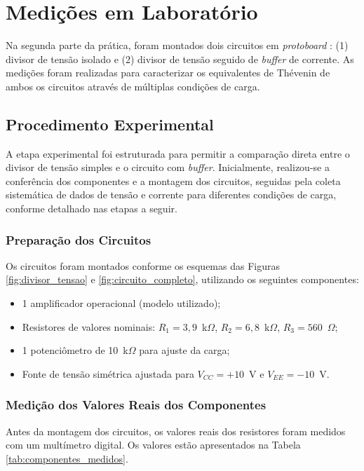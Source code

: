 \chapter{Medições em Laboratório}

Na segunda parte da prática, foram montados dois circuitos em \textit{protoboard} : (1) divisor de tensão isolado e (2) divisor de tensão seguido de \textit{buffer} de corrente. As medições foram realizadas para caracterizar os equivalentes de Thévenin de ambos os circuitos através de múltiplas condições de carga.

\section{Procedimento Experimental}
A etapa experimental foi estruturada para permitir a comparação direta entre o divisor de tensão simples e o circuito com \textit{buffer}. Inicialmente, realizou-se a conferência dos componentes e a montagem dos circuitos, seguidas pela coleta sistemática de dados de tensão e corrente para diferentes condições de carga, conforme detalhado nas etapas a seguir.
\subsection{Preparação dos Circuitos}

Os circuitos foram montados conforme os esquemas das Figuras \ref{fig:divisor_tensao} e \ref{fig:circuito_completo}, utilizando os seguintes componentes:
\begin{itemize}
    \item 1 amplificador operacional (modelo utilizado);
    \item Resistores de valores nominais: $R_1 = 3{,}9$~k$\Omega$, $R_2 = 6{,}8$~k$\Omega$, $R_3 = 560$~$\Omega$;
    \item 1 potenciômetro de 10~k$\Omega$ para ajuste da carga;
    \item Fonte de tensão simétrica ajustada para $V_{CC} = +10$~V e $V_{EE} = -10$~V.
\end{itemize}

\subsection{Medição dos Valores Reais dos Componentes}

Antes da montagem dos circuitos, os valores reais dos resistores foram medidos com um multímetro digital. Os valores estão apresentados na Tabela \ref{tab:componentes_medidos}.

